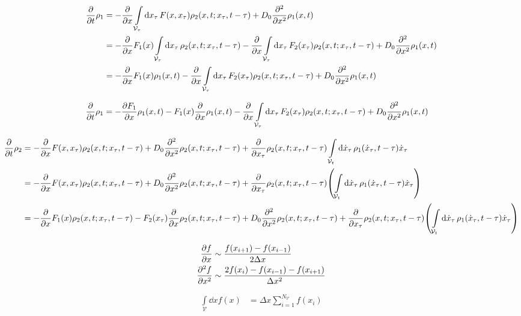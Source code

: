 \documentclass[a4paper,10pt]{article}
\newcommand{\suml}{\sum\limits}
\newcommand{\intl}{\int\limits}
\begin{document}
\begin{align}
	\pdv{t}
	\rho_1
	&=
	-
	\pdv{x}
	\intl_{\mathcal{V}_\tau}
	\dd{x_\tau}
	F(x,x_\tau)
	\rho_2
	(x,t;x_\tau,t-\tau)
	+
	D_0
	\pdv[2]{x}
	\rho_1(x,t)
\\
	&=
	-
	\pdv{x}
	F_1(x)
	\intl_{\mathcal{V}_\tau}
	\dd{x_\tau}
	\rho_2
	(x,t;x_\tau,t-\tau)
	-
	\pdv{x}
	\intl_{\mathcal{V}_\tau}
	\dd{x_\tau}
	F_2(x_\tau)
	\rho_2
	(x,t;x_\tau,t-\tau)	
	+
	D_0
	\pdv[2]{x}
	\rho_1(x,t)
\\
	&=
	-
	\pdv{x}
	F_1(x)
	\rho_1
	(x,t)
	-
	\pdv{x}
	\intl_{\mathcal{V}_\tau}
	\dd{x_\tau}
	F_2(x_\tau)
	\rho_2
	(x,t;x_\tau,t-\tau)	
	+
	D_0
	\pdv[2]{x}
	\rho_1(x,t)
\end{align}

\begin{align}
	\pdv{t}
	\rho_1
	&=
	- 
	\pdv{F_1}{x}
	\rho_1
	(x,t)
	-
	F_1(x)
	\pdv{x}
	\rho_1
	(x,t)
	-
	\pdv{x}
	\intl_{\mathcal{V}_\tau}
	\dd{x_\tau}
	F_2(x_\tau)
	\rho_2
	(x,t;x_\tau,t-\tau)	
	+
	D_0
	\pdv[2]{x}
	\rho_1(x,t)
\end{align}


\begin{align}
	\pdv{t}
	\rho_2
	&=
	-
	\pdv{x}
	F(x,x_\tau)
	\rho_2
	(x,t;x_\tau,t-\tau)
	+
	D_0
	\pdv[2]{x}
	\rho_2
	(x,t;x_\tau,t-\tau)
	+
	\pdv{x_\tau}
	\rho_2
	(x,t;x_\tau,t-\tau)
	\intl_{\mathcal{V}_t}
	\dd{\dot{x}_\tau}
	\rho_1
	(\dot{x}_\tau,t-\tau)
	\dot{x}_\tau
\\
	&=
	-
	\pdv{x}
	F(x,x_\tau)
	\rho_2
	(x,t;x_\tau,t-\tau)
	+
	D_0
	\pdv[2]{x}
	\rho_2
	(x,t;x_\tau,t-\tau)
	+
	\pdv{x_\tau}
	\rho_2
	(x,t;x_\tau,t-\tau)
	\pqty{
		\intl_{\mathcal{V}_t}
		\dd{\dot{x}_\tau}
		\rho_1
		(\dot{x}_\tau,t-\tau)
		\dot{x}_\tau
	}
\\
	&=
	-
	\pdv{x}
	F_1(x)
	\rho_2
	(x,t;x_\tau,t-\tau)
	-
	F_2(x_\tau)
	\pdv{x}
	\rho_2
	(x,t;x_\tau,t-\tau)
	+
	D_0
	\pdv[2]{x}
	\rho_2
	(x,t;x_\tau,t-\tau)
	+
	\pdv{x_\tau}
	\rho_2
	(x,t;x_\tau,t-\tau)
	\pqty{
		\intl_{\mathcal{V}_t}
		\dd{\dot{x}_\tau}
		\rho_1
		(\dot{x}_\tau,t-\tau)
		\dot{x}_\tau
	}
\end{align}

\begin{align}
	\pdv{f}{x}
	&\sim
	\frac{f(x_{i+1})-f(x_{i-1})}{2\Delta x}
\\
	\pdv[2]{f}{x}
	&\sim
	\frac{2f(x_{i})-f(x_{i-1})-f(x_{i+1})}{\Delta x^2}
\end{align}

\begin{align}
	\intl_{\mathcal{V}}
	\dd{x}
	f(x)
	&=
	\Delta x
	\suml_{i=1}^{N_\mathcal{V}}
	f(x_i)
\end{align}
\end{document}
